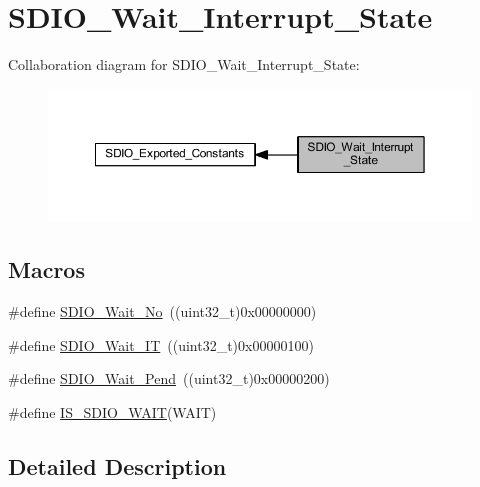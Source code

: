 \hypertarget{group___s_d_i_o___wait___interrupt___state}{}\section{S\+D\+I\+O\+\_\+\+Wait\+\_\+\+Interrupt\+\_\+\+State}
\label{group___s_d_i_o___wait___interrupt___state}
Collaboration diagram for S\+D\+I\+O\+\_\+\+Wait\+\_\+\+Interrupt\+\_\+\+State\+:
\nopagebreak
\begin{figure}[H]
\begin{center}
\leavevmode
\includegraphics[width=350pt]{group___s_d_i_o___wait___interrupt___state}
\end{center}
\end{figure}
\subsection*{Macros}
\begin{DoxyCompactItemize}
\item 
\#define \hyperlink{group___s_d_i_o___wait___interrupt___state_ga266294e1ffd7a4b45e62bff753ca44b2}{S\+D\+I\+O\+\_\+\+Wait\+\_\+\+No}~((uint32\+\_\+t)0x00000000)
\item 
\#define \hyperlink{group___s_d_i_o___wait___interrupt___state_ga3914bbe26a656c8e151272ccdc12c71c}{S\+D\+I\+O\+\_\+\+Wait\+\_\+\+IT}~((uint32\+\_\+t)0x00000100)
\item 
\#define \hyperlink{group___s_d_i_o___wait___interrupt___state_ga2a4104023a7f8403ddd159ec3bbb8592}{S\+D\+I\+O\+\_\+\+Wait\+\_\+\+Pend}~((uint32\+\_\+t)0x00000200)
\item 
\#define \hyperlink{group___s_d_i_o___wait___interrupt___state_ga7ee5c289c8e06a76b849808d15b03810}{I\+S\+\_\+\+S\+D\+I\+O\+\_\+\+W\+A\+IT}(W\+A\+IT)
\end{DoxyCompactItemize}


\subsection{Detailed Description}


